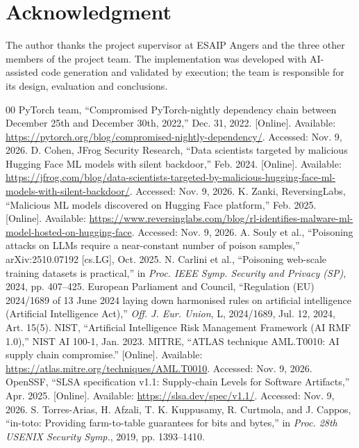 \documentclass[conference]{IEEEtran}
\begin{document}
\section*{Acknowledgment}
The author thanks the project supervisor at ESAIP Angers and the three other members of the project team. The implementation was developed with AI-assisted code generation and validated by execution; the team is responsible for its design, evaluation and conclusions.

\begin{thebibliography}{00}
 PyTorch team, ``Compromised PyTorch-nightly dependency chain between December 25th and December 30th, 2022,'' Dec. 31, 2022. [Online]. Available: \url{https://pytorch.org/blog/compromised-nightly-dependency/}. Accessed: Nov. 9, 2026.
 D. Cohen, JFrog Security Research, ``Data scientists targeted by malicious Hugging Face ML models with silent backdoor,'' Feb. 2024. [Online]. Available: \url{https://jfrog.com/blog/data-scientists-targeted-by-malicious-hugging-face-ml-models-with-silent-backdoor/}. Accessed: Nov. 9, 2026.
 K. Zanki, ReversingLabs, ``Malicious ML models discovered on Hugging Face platform,'' Feb. 2025. [Online]. Available: \url{https://www.reversinglabs.com/blog/rl-identifies-malware-ml-model-hosted-on-hugging-face}. Accessed: Nov. 9, 2026.
 A. Souly et al., ``Poisoning attacks on LLMs require a near-constant number of poison samples,'' arXiv:2510.07192 [cs.LG], Oct. 2025.
 N. Carlini et al., ``Poisoning web-scale training datasets is practical,'' in \emph{Proc. IEEE Symp. Security and Privacy (SP)}, 2024, pp. 407--425.
 European Parliament and Council, ``Regulation (EU) 2024/1689 of 13 June 2024 laying down harmonised rules on artificial intelligence (Artificial Intelligence Act),'' \emph{Off. J. Eur. Union}, L, 2024/1689, Jul. 12, 2024, Art. 15(5).
 NIST, ``Artificial Intelligence Risk Management Framework (AI RMF 1.0),'' NIST AI 100-1, Jan. 2023.
 MITRE, ``ATLAS technique AML.T0010: AI supply chain compromise.'' [Online]. Available: \url{https://atlas.mitre.org/techniques/AML.T0010}. Accessed: Nov. 9, 2026.
 OpenSSF, ``SLSA specification v1.1: Supply-chain Levels for Software Artifacts,'' Apr. 2025. [Online]. Available: \url{https://slsa.dev/spec/v1.1/}. Accessed: Nov. 9, 2026.
 S. Torres-Arias, H. Afzali, T. K. Kuppusamy, R. Curtmola, and J. Cappos, ``in-toto: Providing farm-to-table guarantees for bits and bytes,'' in \emph{Proc. 28th USENIX Security Symp.}, 2019, pp. 1393--1410.

\end{thebibliography}
\end{document}
